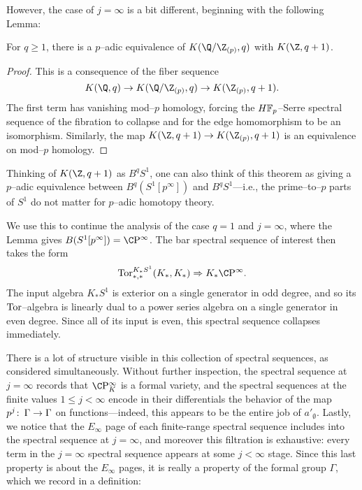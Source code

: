 However, the case of $j = \infty$ is a bit different, beginning with the following Lemma:

\begin{lemma}
For $q \ge 1$, there is a $p$--adic equivalence of $K(\Q/\Z_{(p)}, q)$ with $K(\Z, q+1)$.
\end{lemma}
\begin{proof}
This is a consequence of the fiber sequence \[K(\Q, q) \to K(\Q/\Z_{(p)}, q) \to K(\Z_{(p)}, q+1).\]  The first term has vanishing mod--$p$ homology, forcing the $\HFp$--Serre spectral sequence of the fibration to collapse and for the edge homomorphism to be an isomorphism.  Similarly, the map $K(\Z, q+1) \to K(\Z_{(p)}, q+1)$ is an equivalence on mod--$p$ homology.
\end{proof}

\begin{remark}
Thinking of $K(\Z, q+1)$ as $B^q S^1$, one can also think of this theorem as giving a $p$--adic equivalence between $B^q(S^1[p^\infty])$ and $B^q S^1$---i.e., the prime--to--$p$ parts of $S^1$ do not matter for $p$--adic homotopy theory.
\end{remark}

We use this to continue the analysis of the case $q = 1$ and $j = \infty$, where the Lemma gives $B(S^1[p^\infty]) = \CP^\infty$.  The bar spectral sequence of interest then takes the form \[\Tor^{K_* S^1}_{*, *}(K_*, K_*) \Rightarrow K_* \CP^\infty.\]  The input algebra $K_* S^1$ is exterior on a single generator in odd degree, and so its $\operatorname{Tor}$--algebra is linearly dual to a power series algebra on a single generator in even degree.  Since all of its input is even, this spectral sequence collapses immediately.

There is a lot of structure visible in this collection of spectral sequences, as considered simultaneously.  Without further inspection, the spectral sequence at $j = \infty$ records that $\CP^\infty_K$ is a formal variety, and the spectral sequences at the finite values $1 \le j < \infty$ encode in their differentials the behavior of the map $p^j\colon\thinspace \Gamma \to \Gamma$ on functions---indeed, this appears to be the entire job of $a'_\emptyset$.  Lastly, we notice that the $E_\infty$ page of each finite-range spectral sequence includes into the spectral sequence at $j = \infty$, and moreover this filtration is exhaustive: every term in the $j = \infty$ spectral sequence appears at some $j < \infty$ stage.  Since this last property is about the $E_\infty$ pages, it is really a property of the formal group $\Gamma$, which we record in a definition:

